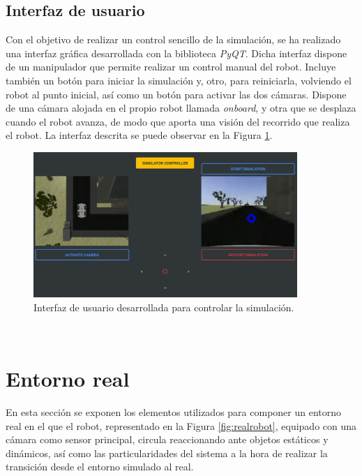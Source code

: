 \subsection{Interfaz de usuario}
\label{subsection:interface}
Con el objetivo de realizar un control sencillo de la simulación, se ha realizado una interfaz gráfica desarrollada con la biblioteca \textit{PyQT}. Dicha interfaz dispone de un manipulador que permite realizar un control manual del robot. Incluye también un botón para iniciar la simulación y, otro, para reiniciarla, volviendo el robot al punto inicial, así como un botón para activar las dos cámaras. Dispone de una cámara alojada en el propio robot llamada \textit{onboard}, y otra que se desplaza cuando el robot avanza, de modo que aporta una visión del recorrido que realiza el robot. La interfaz descrita se puede observar en la Figura \ref{fig:gui}.\\
\begin{figure} [h!]
	\begin{center}
		\includegraphics[width=10cm]{figs/GUI}
	\end{center}
	\caption{Interfaz de usuario desarrollada para controlar la simulación.}
	\label{fig:gui}
\end{figure}\

\section{Entorno real}
\label{section:real}
En esta sección se exponen los elementos utilizados para componer un entorno real en el que el robot, representado en la Figura \ref{fig:realrobot}, equipado con una cámara como sensor principal, circula reaccionando ante objetos estáticos y dinámicos, así como las particularidades del sistema a la hora de realizar la transición desde el entorno simulado al real.

